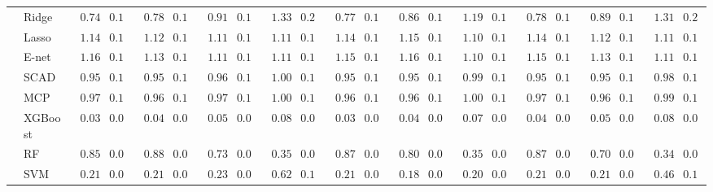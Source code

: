 \begin{tabular}{ll|ll|llllll|llllll|llllll}
 & Ridge  & $\phantom{0}0.74$ & $0.11$ & $\phantom{0}0.78$ & $0.11$ & $\phantom{0}0.91$ & $0.14$ & $\phantom{0}1.33$ & $0.20$ & $\phantom{0}0.77$ & $0.11$ & $\phantom{0}0.86$ & $0.12$ & $\phantom{0}1.19$ & $0.15$ & $\phantom{0}0.78$ & $0.11$ & $\phantom{0}0.89$ & $0.12$ & $\phantom{0}1.31$ & $0.20$ \\
 & Lasso  & $\phantom{0}1.14$ & $0.14$ & $\phantom{0}1.12$ & $0.14$ & $\phantom{0}1.11$ & $0.13$ & $\phantom{0}1.11$ & $0.14$ & $\phantom{0}1.14$ & $0.14$ & $\phantom{0}1.15$ & $0.15$ & $\phantom{0}1.10$ & $0.14$ & $\phantom{0}1.14$ & $0.15$ & $\phantom{0}1.12$ & $0.13$ & $\phantom{0}1.11$ & $0.13$ \\
 & E-net  & $\phantom{0}1.16$ & $0.14$ & $\phantom{0}1.13$ & $0.14$ & $\phantom{0}1.11$ & $0.13$ & $\phantom{0}1.11$ & $0.14$ & $\phantom{0}1.15$ & $0.14$ & $\phantom{0}1.16$ & $0.15$ & $\phantom{0}1.10$ & $0.14$ & $\phantom{0}1.15$ & $0.15$ & $\phantom{0}1.13$ & $0.13$ & $\phantom{0}1.11$ & $0.13$ \\
 & SCAD  & $\phantom{0}0.95$ & $0.12$ & $\phantom{0}0.95$ & $0.11$ & $\phantom{0}0.96$ & $0.11$ & $\phantom{0}1.00$ & $0.11$ & $\phantom{0}0.95$ & $0.11$ & $\phantom{0}0.95$ & $0.11$ & $\phantom{0}0.99$ & $0.11$ & $\phantom{0}0.95$ & $0.11$ & $\phantom{0}0.95$ & $0.11$ & $\phantom{0}0.98$ & $0.11$ \\
 & MCP  & $\phantom{0}0.97$ & $0.11$ & $\phantom{0}0.96$ & $0.11$ & $\phantom{0}0.97$ & $0.11$ & $\phantom{0}1.00$ & $0.11$ & $\phantom{0}0.96$ & $0.11$ & $\phantom{0}0.96$ & $0.11$ & $\phantom{0}1.00$ & $0.11$ & $\phantom{0}0.97$ & $0.11$ & $\phantom{0}0.96$ & $0.11$ & $\phantom{0}0.99$ & $0.10$ \\
 & XGBoost  & $\phantom{0}0.03$ & $0.02$ & $\phantom{0}0.04$ & $0.01$ & $\phantom{0}0.05$ & $0.02$ & $\phantom{0}0.08$ & $0.07$ & $\phantom{0}0.03$ & $0.02$ & $\phantom{0}0.04$ & $0.02$ & $\phantom{0}0.07$ & $0.05$ & $\phantom{0}0.04$ & $0.02$ & $\phantom{0}0.05$ & $0.03$ & $\phantom{0}0.08$ & $0.07$ \\
 & RF  & $\phantom{0}0.85$ & $0.07$ & $\phantom{0}0.88$ & $0.07$ & $\phantom{0}0.73$ & $0.07$ & $\phantom{0}0.35$ & $0.04$ & $\phantom{0}0.87$ & $0.07$ & $\phantom{0}0.80$ & $0.07$ & $\phantom{0}0.35$ & $0.04$ & $\phantom{0}0.87$ & $0.07$ & $\phantom{0}0.70$ & $0.06$ & $\phantom{0}0.34$ & $0.04$ \\
 & SVM  & $\phantom{0}0.21$ & $0.05$ & $\phantom{0}0.21$ & $0.06$ & $\phantom{0}0.23$ & $0.06$ & $\phantom{0}0.62$ & $0.19$ & $\phantom{0}0.21$ & $0.04$ & $\phantom{0}0.18$ & $0.03$ & $\phantom{0}0.20$ & $0.04$ & $\phantom{0}0.21$ & $0.04$ & $\phantom{0}0.21$ & $0.06$ & $\phantom{0}0.46$ & $0.17$ \\\hline

\end{tabular}
